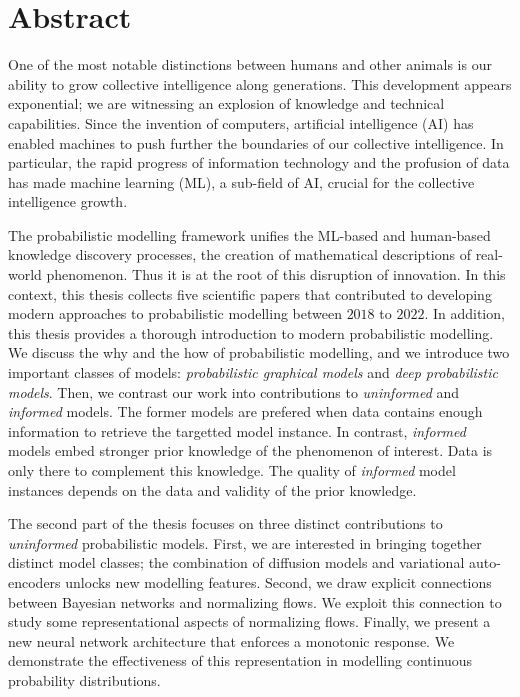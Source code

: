 
\chapter*{Abstract}
One of the most notable distinctions between humans and other animals is our ability to grow collective intelligence along generations. This development appears exponential; we are witnessing an explosion of knowledge and technical capabilities. Since the invention of computers, artificial intelligence (AI) has enabled machines to push further the boundaries of our collective intelligence.
In particular, the rapid progress of information technology and the profusion of data has made machine learning (ML), a sub-field of AI, crucial for the collective intelligence growth.

The probabilistic modelling framework unifies the ML-based and human-based knowledge discovery processes, the creation of mathematical descriptions of real-world phenomenon. Thus it is at the root of this disruption of innovation. In this context, this thesis collects five scientific papers that contributed to developing modern approaches to probabilistic modelling between $2018$ to $2022$.
In addition, this thesis provides a thorough introduction to modern probabilistic modelling. We discuss the why and the how of probabilistic modelling, and we introduce two important classes of models: \textit{probabilistic graphical models} and \textit{deep probabilistic models}. Then, we contrast our work into contributions to \textit{uninformed} and \textit{informed} models. The former models are prefered when data contains enough information to retrieve the targetted model instance. In contrast, \textit{informed} models embed stronger prior knowledge of the phenomenon of interest. Data is only there to complement this knowledge. The quality of \textit{informed} model instances depends on the data and validity of the prior knowledge.

The second part of the thesis focuses on three distinct contributions to \textit{uninformed} probabilistic models. First, we are interested in bringing together distinct model classes; the combination of diffusion models and variational auto-encoders unlocks new modelling features. Second, we draw explicit connections between Bayesian networks and normalizing flows. We exploit this connection to study some representational aspects of normalizing flows. Finally, we present a new neural network architecture that enforces a monotonic response. We demonstrate the effectiveness of this representation in modelling continuous probability distributions.

